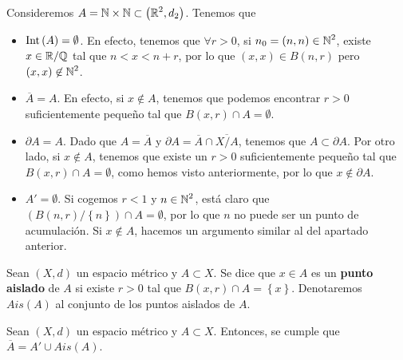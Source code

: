 \begin{eg}
Consideremos $\displaystyle A = \mathbb{N} \times \mathbb{N} \subset \left(\mathbb{R}^{2}, d _{2}\right)$. Tenemos que 
\begin{itemize}
\item $\displaystyle \operatorname{Int}\left(A\right) = \emptyset $. En efecto, tenemos que $\displaystyle \forall r > 0 $, si $\displaystyle n_{0} = \left(n,n\right) \in \mathbb{N}^{2} $, existe $\displaystyle x \in \mathbb{R}/\mathbb{Q} $ tal que $\displaystyle n < x < n + r $, por lo que $\displaystyle \left(x,x\right) \in B\left(n,r\right) $ pero $\displaystyle \left(x,x\right)\not\in \mathbb{N}^{2} $.
\item $\displaystyle \overline{A} = A $. En efecto, si $\displaystyle x \not\in A$, tenemos que podemos encontrar $\displaystyle r > 0 $ suficientemente pequeño tal que $\displaystyle B\left(x,r\right) \cap A = \emptyset $.
\item $\displaystyle \partial A = A $. Dado que $\displaystyle A = \overline{A} $ y $\displaystyle \partial A= \overline{A} \cap \overline{X/A} $, tenemos que $\displaystyle A \subset \partial A $. Por otro lado, si $\displaystyle x \not\in A $, tenemos que existe un $\displaystyle r>0 $ suficientemente pequeño tal que $\displaystyle B\left(x,r\right) \cap A = \emptyset $, como hemos visto anteriormente, por lo que $\displaystyle x \not\in \partial A $. 
\item $\displaystyle A' = \emptyset $. Si cogemos $\displaystyle r < 1 $ y $\displaystyle n \in \mathbb{N}^{2} $, está claro que $\displaystyle \left(B\left(n,r\right)/ \left\{ n\right\} \right) \cap A = \emptyset $, por lo que $\displaystyle n $ no puede ser un punto de acumulación. Si $\displaystyle x \not\in A $, hacemos un argumento similar al del apartado anterior.
\end{itemize}
\end{eg}
\begin{definition}
	Sean $\displaystyle \left(X,d\right) $ un espacio métrico y $\displaystyle A \subset X $. Se dice que $\displaystyle x \in A $ es un \textbf{punto aislado} de $\displaystyle A $ si existe $\displaystyle r > 0 $ tal que $\displaystyle B\left(x,r\right) \cap A = \left\{ x\right\}  $. Denotaremos $\displaystyle Ais\left(A\right) $ al conjunto de los puntos aislados de $\displaystyle A $.
\end{definition}
\begin{prop}
Sean $\displaystyle \left(X, d\right) $ un espacio métrico y $\displaystyle A \subset X $. Entonces, se cumple que $\displaystyle \overline{A} = A' \cup Ais\left(A\right) $.
\end{prop}
